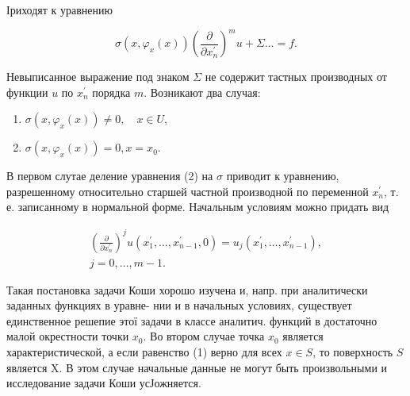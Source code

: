 \documentclass[10pt]{article}
\begin{document}
Іриходят к уравнению



\[

\sigma\left(x, \varphi_{x}(x)\right)\left(\frac{\partial}{\partial x_{n}^{\prime}}\right)^{m} u+\Sigma \ldots=f .

\]



Невыписанное выражение под знаком $\Sigma$ не содержит тастных производных от функции $u$ по $x_{n}^{\prime}$ порядка $m$. Возникают два случая:



\begin{enumerate}

  \item $\sigma\left(x, \varphi_{x}(x)\right) \neq 0, \quad x \in U$,



  \item $\sigma\left(x, \varphi_{x}(x)\right)=0, x=x_{0}$.



\end{enumerate}



В первом слутае деление уравнения (2) на $\sigma$ приводит к уравнению, разрешенному относительно старшей частной производной по переменной $x_{n}^{\prime}$, т. е. записанному в нормальной форме. Начальным условиям можно придать вид



\[

\begin{gathered}

\left(\frac{\partial}{\partial x_{n}^{\prime}}\right)^{j} u\left(x_{1}^{\prime}, \ldots, x_{n-1}^{\prime}, 0\right)=u_{j}\left(x_{1}^{\prime}, \ldots, x_{n-1}^{\prime}\right), \\

j=0, \ldots, m-1 .

\end{gathered}

\]



Такая постановка задачи Коши хорошо изучена и, напр. при аналитически заданных функциях в уравне- нии и в начальных условиях, существует единственное решепие этої задачи в классе аналитич. функций в достаточно малой окрестности точки $x_{0}$. Во втором случае точка $x_{0}$ является характеристической, а если равенство (1) верно для всех $x \in S$, то поверхность $S$ является $\mathrm{X}$. В этом случае начальные данные не могут быть произвольными и исследование задачи Коши усЈожняется.
\end{document}
